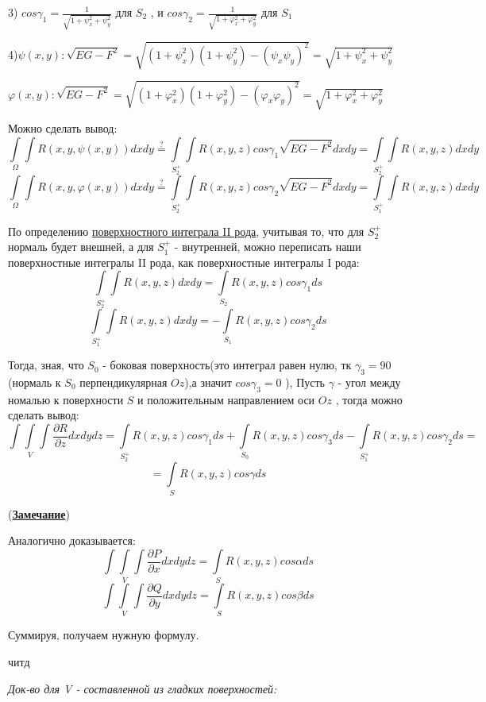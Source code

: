 \documentclass[12pt, english]{article}
\begin{document}
3) \hyperref[eq10]{$cos\gamma_1 = \frac{1}{\sqrt{1 + \psi_x^2 + \psi_y^2 }}$} для $S_2$ , и $cos\gamma_2 = \frac{1}{\sqrt{1 + \varphi_x^2 + \varphi_y^2 }} $ для $S_1$

4)$\psi(x,y) : \sqrt{EG - F^2} = \sqrt{(1 + \psi_x^2)(1 + \psi_y^2) - (\psi_x \psi_y)^2} = \sqrt{1 + \psi_x^2 + \psi_y^2 }$

  \par $\varphi(x,y) : \sqrt{EG - F^2} = \sqrt{(1 + \varphi_x^2)(1 + \varphi_y^2) - (\varphi_x \varphi_y)^2} = \sqrt{1 + \varphi_x^2 + \varphi_y^2 }$

Можно сделать вывод:
$$
\int\limits_{\Omega}\int R(x,y,\psi(x,y))dxdy 
\stackrel{?}{=}
\int\limits_{S_2^+}\int R(x,y,z)  cos\gamma_1  \sqrt{EG - F^2} dxdy
=
\int\limits_{S_2^+}\int R(x,y,z)dxdy
$$
$$
\int\limits_{\Omega}\int R(x,y,\varphi(x,y))dxdy 
\stackrel{?}{=}
\int\limits_{S_2^+}\int R(x,y,z)  cos\gamma_2  \sqrt{EG - F^2} dxdy
= 
\int\limits_{S_1^+}\int R(x,y,z)dxdy
$$


По определению \hyperref[eq9]{поверхностного интеграла II рода}, учитывая то, что для $S_2^+$
нормаль будет внешней, а для $S_1^+$ - внутренней, можно переписать наши поверхностные интегралы II рода,
как поверхностные интегралы I рода:
	$$\int\limits_{S_2^+}\int R(x,y,z)dxdy = \int\limits_{S_2} R(x,y,z)cos\gamma_1 ds$$
	$$\int\limits_{S_1^+}\int R(x,y,z)dxdy = -\int\limits_{S_1} R(x,y,z)cos\gamma_2 ds$$

Тогда, зная, что $S_0$ - боковая поверхность(это интеграл равен нулю, тк $\gamma_3 = 90$(нормаль к $S_0$ перпендикулярная $Oz$),а значит $cos\gamma_3 = 0$ ), Пусть $\gamma$ - угол между номалью к поверхности $S$ и положительным направлением оси $Oz$ ,
тогда можно сделать вывод:
$$
\int\int\limits_{V}\int \frac{\partial R}{\partial z}dxdydz = \int\limits_{S_2^+} R(x,y,z)cos\gamma_1 ds + 
\int\limits_{S_0} R(x,y,z)cos\gamma_3 ds - \int\limits_{S_1^+} R(x,y,z)cos\gamma_2 ds =
$$
$$
=
\int\limits_{S} R(x,y,z)cos\gamma ds 
$$

(\hyperref[eq11]{\textbf{Замечание}})

Аналогично доказывается:
$$
\int\int\limits_{V}\int \frac{\partial P}{\partial x}dxdydz = \int\limits_{S} R(x,y,z)cos\alpha ds 
$$
$$
\int\int\limits_{V}\int \frac{\partial Q}{\partial y}dxdydz = \int\limits_{S} R(x,y,z)cos\beta ds 
$$

Суммируя, получаем нужную формулу.

читд

\textit{Док-во для V - составленной из гладких поверхностей:}
\end{document}
